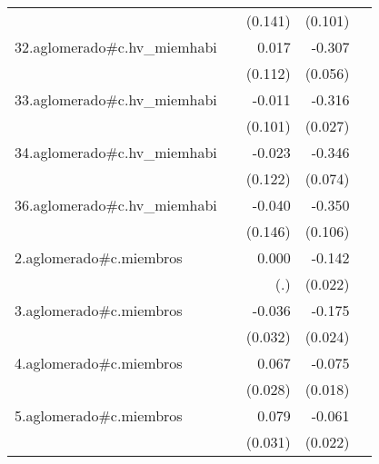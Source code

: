 {\begin{longtable}{l*{4}{D{.}{.}{-1}}}
            &                     &     (0.141)         &     (0.101)         &                     \\
\addlinespace
32.aglomerado#c.hv\_miemhabi&                     &       0.017         &      -0.307\sym{***}&                     \\
            &                     &     (0.112)         &     (0.056)         &                     \\
\addlinespace
33.aglomerado#c.hv\_miemhabi&                     &      -0.011         &      -0.316\sym{***}&                     \\
            &                     &     (0.101)         &     (0.027)         &                     \\
\addlinespace
34.aglomerado#c.hv\_miemhabi&                     &      -0.023         &      -0.346\sym{***}&                     \\
            &                     &     (0.122)         &     (0.074)         &                     \\
\addlinespace
36.aglomerado#c.hv\_miemhabi&                     &      -0.040         &      -0.350\sym{***}&                     \\
            &                     &     (0.146)         &     (0.106)         &                     \\
\addlinespace
2.aglomerado#c.miembros&                     &       0.000         &      -0.142\sym{***}&                     \\
            &                     &         (.)         &     (0.022)         &                     \\
\addlinespace
3.aglomerado#c.miembros&                     &      -0.036         &      -0.175\sym{***}&                     \\
            &                     &     (0.032)         &     (0.024)         &                     \\
\addlinespace
4.aglomerado#c.miembros&                     &       0.067\sym{*}  &      -0.075\sym{***}&                     \\
            &                     &     (0.028)         &     (0.018)         &                     \\
\addlinespace
5.aglomerado#c.miembros&                     &       0.079\sym{**} &      -0.061\sym{**} &                     \\
            &                     &     (0.031)         &     (0.022)         &                     \\

\end{longtable}}
